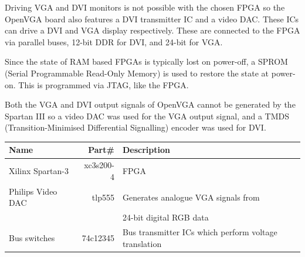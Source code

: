 Driving VGA and DVI monitors is not possible with the chosen FPGA so the OpenVGA
board also features a DVI transmitter IC and a video DAC. These ICs can drive a
DVI and VGA display respectively. These are connected to the FPGA via parallel
buses, 12-bit DDR for DVI, and 24-bit for VGA.

Since the state of RAM based FPGAs is typically lost on
power-off\cite{Xilinx_SP3_DS}, a SPROM (Serial Programmable Read-Only Memory) is
used to restore the state at power-on. This is programmed via JTAG, like the
FPGA.


Both the VGA and DVI output signals of OpenVGA cannot be generated by the Spartan
III so a video DAC was used for the VGA output signal, and a TMDS
(Transition-Minimised Differential Signalling) encoder was used for DVI.

\begin{table}[h!]
\begin{center}
\begin{tabular}{l | r | l}
Name				& Part\#		& Description	\\
\hline
Xilinx Spartan-3	& xc3s200-4	& FPGA	\\
Philips Video DAC	& tlp555	& Generates analogue VGA signals from \\
					&			& 24-bit digital RGB data \\
Bus switches		& 74c12345	& Bus transmitter ICs which perform voltage
translation	\\

\end{tabular}
\end{center}
\end{table}

